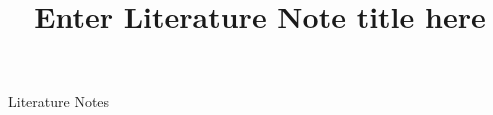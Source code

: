 \documentclass[a4paper,colorinlistoftodos]{article}
\title{Enter Literature Note title here}
\begin{document}
\maketitle

\begingroup
    \hypersetup{linkcolor=black}
    \tableofcontents
    \listoftodos
    \pagebreak
\endgroup

\linenumbers

Literature Notes


\end{document}
